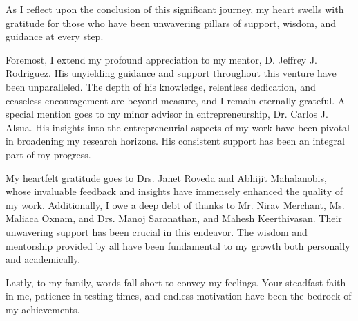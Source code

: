 As I reflect upon the conclusion of this significant journey, my heart swells with gratitude for those who have been unwavering pillars of support, wisdom, and guidance at every step.

Foremost, I extend my profound appreciation to my mentor, D\@. Jeffrey J\@. Rodriguez. His unyielding guidance and support throughout this venture have been unparalleled. The depth of his knowledge, relentless dedication, and ceaseless encouragement are beyond measure, and I remain eternally grateful. A special mention goes to my minor advisor in entrepreneurship, Dr\@. Carlos J\@. Alsua. His insights into the entrepreneurial aspects of my work have been pivotal in broadening my research horizons. His consistent support has been an integral part of my progress.

My heartfelt gratitude goes to Drs. Janet Roveda and Abhijit Mahalanobis, whose invaluable feedback and insights have immensely enhanced the quality of my work. Additionally, I owe a deep debt of thanks to Mr\@. Nirav Merchant, Ms\@. Maliaca Oxnam, and Drs\@. Manoj Saranathan, and Mahesh Keerthivasan. Their unwavering support has been crucial in this endeavor. The wisdom and mentorship provided by all have been fundamental to my growth both personally and academically.

Lastly, to my family, words fall short to convey my feelings. Your steadfast faith in me, patience in testing times, and endless motivation have been the bedrock of my achievements.

